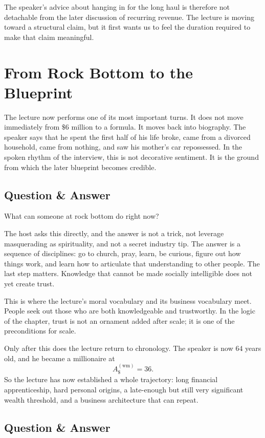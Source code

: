 The speaker's advice about hanging in for the long haul is therefore not detachable from the later discussion of recurring revenue. The lecture is moving toward a structural claim, but it first wants us to feel the duration required to make that claim meaningful.

\section{From Rock Bottom to the Blueprint}

The lecture now performs one of its most important turns. It does not move immediately from \(\$6\) million to a formula. It moves back into biography. The speaker says that he spent the first half of his life broke, came from a divorced household, came from nothing, and saw his mother's car repossessed. In the spoken rhythm of the interview, this is not decorative sentiment. It is the ground from which the later blueprint becomes credible.

\subsection{Question \& Answer}

What can someone at rock bottom do right now?

The host asks this directly, and the answer is not a trick, not leverage masquerading as spirituality, and not a secret industry tip. The answer is a sequence of disciplines: go to church, pray, learn, be curious, figure out how things work, and learn how to articulate that understanding to other people. The last step matters. Knowledge that cannot be made socially intelligible does not yet create trust.

This is where the lecture's moral vocabulary and its business vocabulary meet. People seek out those who are both knowledgeable and trustworthy. In the logic of the chapter, trust is not an ornament added after scale; it is one of the preconditions for scale.

Only after this does the lecture return to chronology. The speaker is now \(64\) years old, and he became a millionaire at
\[
A_{\$}^{(\mathrm{wm})}=36.
\]
So the lecture has now established a whole trajectory: long financial apprenticeship, hard personal origins, a late-enough but still very significant wealth threshold, and a business architecture that can repeat.

\subsection{Question \& Answer}

